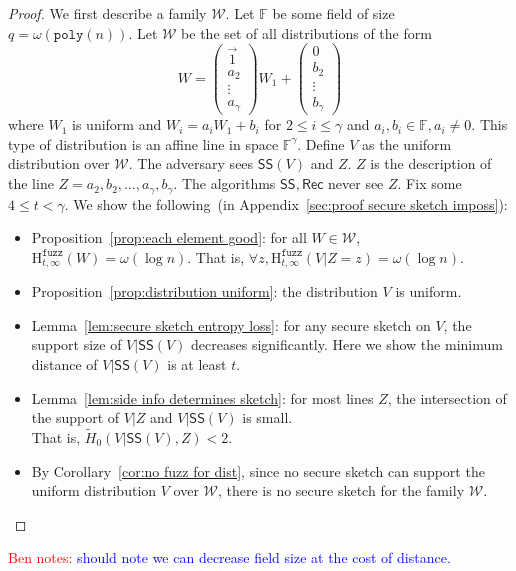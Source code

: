 \documentclass[11pt]{article}
\newcommand{\apref}[1]{\mbox{Appendix~\ref{#1}}}
\newcommand{\corref}[1]{\mbox{Corollary~\ref{#1}}}
\newcommand{\lemref}[1]{\mbox{Lemma~\ref{#1}}}
\newcommand{\propref}[1]{\mbox{Proposition~\ref{#1}}}
\newcommand{\class}[1]{{\ensuremath{\mathsf{#1}}}}
\newcommand{\sketch}{\ensuremath{\class{SS}}\xspace}
\newcommand{\rec}{\ensuremath{\class{Rec}}\xspace}
\newcommand{\poly}{\ensuremath{\mathtt{poly}}\xspace}
\newcommand{\Hfuzz}{\mathrm{H}^{\mathtt{fuzz}}_{t,\infty}}
\newcommand{\authnote}[2]{{\textcolor{red}{\textsf{#1 notes: }\textcolor{blue}{ #2}}\marginpar{\textcolor{red}{\textbf{!!!!!}}}}}
\newcommand{\authnote}[2]{}
\newcommand{\bnote}[1]{{\authnote{Ben}{#1}}}
\begin{document}
\begin{proof}
We first describe a family $\mathcal{W}$.  Let $\mathbb{F}$ be some field of size $q =\omega(\poly(n))$.  
Let $\mathcal{W}$ be the set of all distributions of the form 
\[W =  \begin{pmatrix} \vec{1} \\a_2  \\ \vdots \\ a_{\gamma} \end{pmatrix} W_1 + \begin{pmatrix} 0  \\ 
b_2\\ \vdots \\ b_{\gamma} \end{pmatrix} 
\]
where $W_1$ is uniform and $W_i = a_i W_1 + b_i$ for $2\le i \le \gamma$ and $a_i, b_i\in\mathbb{F}, a_i\neq 0$.  
This type of distribution is an affine line in space $\mathbb{F}^\gamma$.  Define $V$ as the uniform distribution over $\mathcal{W}$.  The adversary sees $\sketch(V)$ and $Z$.  $Z$ is the description of the line $Z = a_2, b_2, ..., a_\gamma, b_\gamma$. The algorithms $\sketch, \rec$ never see $Z$.
Fix some $4\le t < \gamma$.
We show the following~(in \apref{sec:proof secure sketch imposs}):

\begin{itemize}
\item \propref{prop:each element good}: for all $W\in \mathcal{W}$, $\Hfuzz(W) = \omega (\log n)$. That is, $\forall z, \Hfuzz(V | Z=z) = \omega(\log n)$.
\item \propref{prop:distribution uniform}: the distribution $V$ is uniform.
\item \lemref{lem:secure sketch entropy loss}: for any secure sketch on $V$, the support size of $V | \sketch(V)$ decreases significantly.  Here we show the minimum distance of $V|\sketch(V)$ is at least $t$.
\item \lemref{lem:side info determines sketch}:  for most lines $Z$, the intersection of the support of $V|Z$ and $V | \sketch(V)$ is small.  \\That is, $\tilde{H}_0(V | \sketch(V), Z) < 2$.
\item By \corref{cor:no fuzz for dist}, since no secure sketch can support the uniform distribution $V$ over $\mathcal{W}$, there is no secure sketch for the family $\mathcal{W}$.\end{itemize}
\end{proof}
\bnote{should note we can decrease field size at the cost of distance.}
\end{document}
